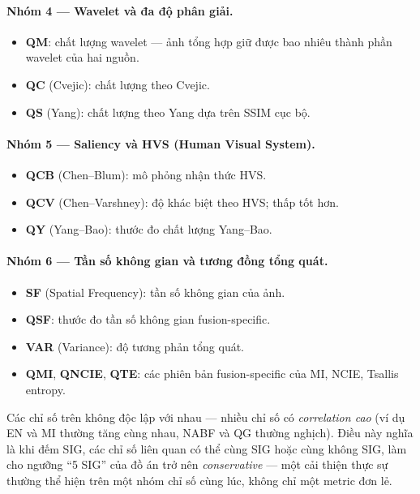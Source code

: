 \paragraph{Nhóm 4 --- Wavelet và đa độ phân giải.}
\begin{itemize}\itemsep0pt
    \item \textbf{QM}: chất lượng wavelet --- ảnh tổng hợp giữ được bao nhiêu thành phần wavelet của hai nguồn.
    \item \textbf{QC} (Cvejic): chất lượng theo Cvejic.
    \item \textbf{QS} (Yang): chất lượng theo Yang dựa trên SSIM cục bộ.
\end{itemize}

\paragraph{Nhóm 5 --- Saliency và HVS (Human Visual System).}
\begin{itemize}\itemsep0pt
    \item \textbf{QCB} (Chen--Blum): mô phỏng nhận thức HVS.
    \item \textbf{QCV} (Chen--Varshney): độ khác biệt theo HVS; thấp tốt hơn.
    \item \textbf{QY} (Yang--Bao): thước đo chất lượng Yang--Bao.
\end{itemize}

\paragraph{Nhóm 6 --- Tần số không gian và tương đồng tổng quát.}
\begin{itemize}\itemsep0pt
    \item \textbf{SF} (Spatial Frequency): tần số không gian của ảnh.
    \item \textbf{QSF}: thước đo tần số không gian fusion-specific.
    \item \textbf{VAR} (Variance): độ tương phản tổng quát.
    \item \textbf{QMI}, \textbf{QNCIE}, \textbf{QTE}: các phiên bản fusion-specific của MI, NCIE, Tsallis entropy.
\end{itemize}

Các chỉ số trên không độc lập với nhau --- nhiều chỉ số có \emph{correlation cao} (ví dụ EN và MI thường tăng cùng nhau, NABF và QG thường nghịch). Điều này nghĩa là khi đếm SIG, các chỉ số liên quan có thể cùng SIG hoặc cùng không SIG, làm cho ngưỡng ``5 SIG'' của đồ án trở nên \emph{conservative} --- một cải thiện thực sự thường thể hiện trên một nhóm chỉ số cùng lúc, không chỉ một metric đơn lẻ.


